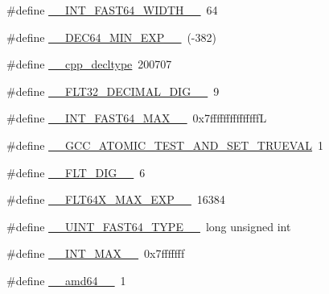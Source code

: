 \begin{DoxyCompactItemize}
\item 
\#define \hyperlink{cmake-build-debug_2babel__client__autogen_2moc__predefs_8h_ad4fca572f500aba76348d0942a2c5827}{\+\_\+\+\_\+\+I\+N\+T\+\_\+\+F\+A\+S\+T64\+\_\+\+W\+I\+D\+T\+H\+\_\+\+\_\+}~64
\item 
\#define \hyperlink{cmake-build-debug_2babel__client__autogen_2moc__predefs_8h_ade7aebdae6e8389a450aac653544c33f}{\+\_\+\+\_\+\+D\+E\+C64\+\_\+\+M\+I\+N\+\_\+\+E\+X\+P\+\_\+\+\_\+}~(-\/382)
\item 
\#define \hyperlink{cmake-build-debug_2babel__client__autogen_2moc__predefs_8h_a5bc62cc317387328499b3ea753c5c4a3}{\+\_\+\+\_\+cpp\+\_\+decltype}~200707
\item 
\#define \hyperlink{cmake-build-debug_2babel__client__autogen_2moc__predefs_8h_a24d259c69bea7fb471668df7190c71c6}{\+\_\+\+\_\+\+F\+L\+T32\+\_\+\+D\+E\+C\+I\+M\+A\+L\+\_\+\+D\+I\+G\+\_\+\+\_\+}~9
\item 
\#define \hyperlink{cmake-build-debug_2babel__client__autogen_2moc__predefs_8h_af456a5199e68c3ff20996a5bdf9b4691}{\+\_\+\+\_\+\+I\+N\+T\+\_\+\+F\+A\+S\+T64\+\_\+\+M\+A\+X\+\_\+\+\_\+}~0x7fffffffffffffffL
\item 
\#define \hyperlink{cmake-build-debug_2babel__client__autogen_2moc__predefs_8h_a035c056d72e677daa49cc2c7dbeed083}{\+\_\+\+\_\+\+G\+C\+C\+\_\+\+A\+T\+O\+M\+I\+C\+\_\+\+T\+E\+S\+T\+\_\+\+A\+N\+D\+\_\+\+S\+E\+T\+\_\+\+T\+R\+U\+E\+V\+AL}~1
\item 
\#define \hyperlink{cmake-build-debug_2babel__client__autogen_2moc__predefs_8h_a03e66bc6e427f0c968a7a0daec280729}{\+\_\+\+\_\+\+F\+L\+T\+\_\+\+D\+I\+G\+\_\+\+\_\+}~6
\item 
\#define \hyperlink{cmake-build-debug_2babel__client__autogen_2moc__predefs_8h_a43c037cf54e7474a2be1d46c4f785fe9}{\+\_\+\+\_\+\+F\+L\+T64\+X\+\_\+\+M\+A\+X\+\_\+\+E\+X\+P\+\_\+\+\_\+}~16384
\item 
\#define \hyperlink{cmake-build-debug_2babel__client__autogen_2moc__predefs_8h_a3877156c4b30153ae764b0dad8d8130a}{\+\_\+\+\_\+\+U\+I\+N\+T\+\_\+\+F\+A\+S\+T64\+\_\+\+T\+Y\+P\+E\+\_\+\+\_\+}~long unsigned int
\item 
\#define \hyperlink{cmake-build-debug_2babel__client__autogen_2moc__predefs_8h_a20fcee7a683d69340d8c3d126e5a7f12}{\+\_\+\+\_\+\+I\+N\+T\+\_\+\+M\+A\+X\+\_\+\+\_\+}~0x7fffffff
\item 
\#define \hyperlink{cmake-build-debug_2babel__client__autogen_2moc__predefs_8h_a8d57bedda11fe9ca16132e126d84669e}{\+\_\+\+\_\+amd64\+\_\+\+\_\+}~1
\item 

\end{DoxyCompactItemize}
